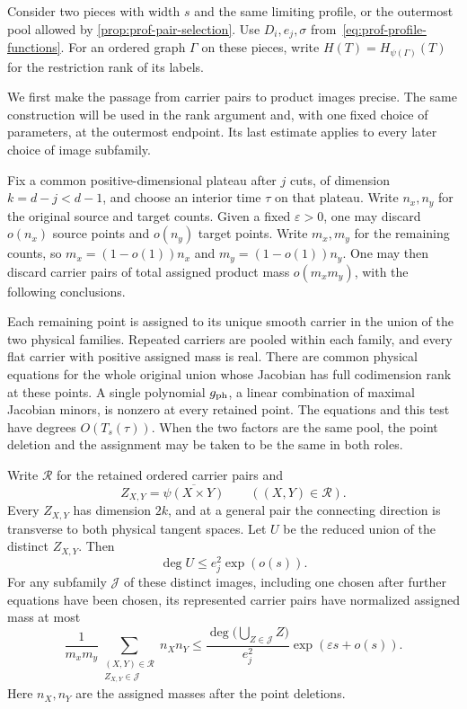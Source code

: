 Consider two pieces with width $s$ and the same limiting profile, or the outermost pool allowed by \cref{prop:prof-pair-selection}. Use $D_i,e_j,\sigma$ from~\eqref{eq:prof-profile-functions}. For an ordered graph $\Gamma$ on these pieces, write $H(T)=H_{\psi(\Gamma)}(T)$ for the restriction rank of its labels.

We first make the passage from carrier pairs to product images precise. The same construction will be used in the rank argument and, with one fixed choice of parameters, at the outermost endpoint.  Its last estimate applies to every later choice of image subfamily.

\begin{lemma}
\label{lem:sc-retained-products}
Fix a common positive-dimensional plateau after $j$ cuts, of dimension $k=d-j<d-1$, and choose an interior time $\tau$ on that plateau.  Write $n_x,n_y$ for the original source and target counts.  Given a fixed $\varepsilon>0$, one may discard $o(n_x)$ source points and $o(n_y)$ target points.  Write $m_x,m_y$ for the remaining counts, so $m_x=(1-o(1))n_x$ and $m_y=(1-o(1))n_y$.  One may then discard carrier pairs of total assigned product mass $o(m_xm_y)$, with the following conclusions.

Each remaining point is assigned to its unique smooth carrier in the union of the two physical families.  Repeated carriers are pooled within each family, and every flat carrier with positive assigned mass is real. There are common physical equations for the whole original union whose Jacobian has full codimension rank at these points.  A single polynomial $g_{\rm ph}$, a linear combination of maximal Jacobian minors, is nonzero at every retained point.  The equations and this test have degrees $O(T_s(\tau))$. When the two factors are the same pool, the point deletion and the assignment may be taken to be the same in both roles.

Write $\mathcal{R}$ for the retained ordered carrier pairs and
\[
 Z_{X,Y}=\overline{\psi(X\times Y)}\qquad((X,Y)\in\mathcal{R}).
\]
Every $Z_{X,Y}$ has dimension $2k$, and at a general pair the connecting direction is transverse to both physical tangent spaces.  Let $U$ be the reduced union of the distinct $Z_{X,Y}$.  Then
\begin{equation}\label{eq:sc-retained-image-upper}
 \deg U\le e_j^2\exp(o(s)).
\end{equation}
For any subfamily $\mathcal{J}$ of these distinct images, including one chosen after further equations have been chosen, its represented carrier pairs have normalized assigned mass at most
\begin{equation}\label{eq:sc-retained-image-mass}
 \frac{1}{m_xm_y}
 \sum_{\substack{(X,Y)\in\mathcal{R}\\Z_{X,Y}\in\mathcal{J}}}n_Xn_Y
 \le \frac{\deg\bigl(\bigcup_{Z\in\mathcal{J}}Z\bigr)}{e_j^2}
       \exp(\varepsilon s+o(s)).
\end{equation}
Here $n_X,n_Y$ are the assigned masses after the point deletions.
\end{lemma}

